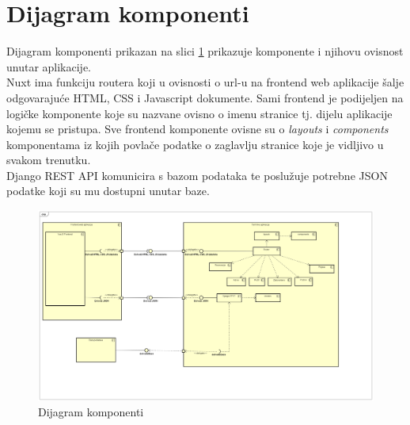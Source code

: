 		\section{Dijagram komponenti}
		
			Dijagram komponenti prikazan na slici \ref{fig:dijagram_komponenti} prikazuje komponente i njihovu ovisnost unutar aplikacije. \\Nuxt ima funkciju routera koji u ovisnosti o url-u na frontend web aplikacije šalje odgovarajuće HTML, CSS i Javascript dokumente. Sami frontend je podijeljen na logičke komponente koje su nazvane ovisno o imenu stranice tj. dijelu aplikacije kojemu se pristupa. Sve frontend komponente ovisne su o \textit{layouts} i \textit{components} komponentama iz kojih povlače podatke o zaglavlju stranice koje je vidljivo u svakom trenutku.\\ Django REST API komunicira s bazom podataka te poslužuje potrebne JSON podatke koji su mu dostupni unutar baze.
			
			\begin{figure}[H]
				\includegraphics[width=.9\linewidth]{slike/dijagram_komponenti.PNG}
				\centering
				\caption{Dijagram komponenti}
				\label{fig:dijagram_komponenti}
			\end{figure}